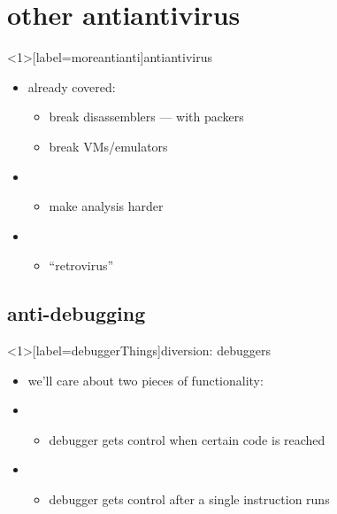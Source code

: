 \section{other antiantivirus}

\begin{frame}<1>[label=moreantianti]{antiantivirus} 
    \begin{itemize}
    \item already covered:
        \begin{itemize}
        \item break disassemblers --- with packers
        \item break VMs/emulators
        \end{itemize}
    \item {}
        \begin{itemize}
        \item make analysis harder
        \end{itemize}
    \item {}
        \begin{itemize}
        \item ``retrovirus''
        \end{itemize}
    \end{itemize}
\end{frame}


\subsection{anti-debugging}

\begin{frame}<1>[label=debuggerThings]{diversion: debuggers}
    \begin{itemize}
    \item we'll care about two pieces of functionality:
    \vspace{.5cm}
    \item {}
        \begin{itemize}
        \item debugger gets control when certain code is reached
        \end{itemize}
    \item {}
        \begin{itemize}
        \item debugger gets control after a single instruction runs
        \end{itemize}
    \end{itemize}
\end{frame}

